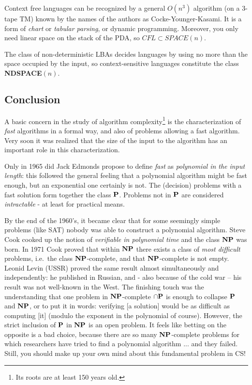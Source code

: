 Context free languages can be recognized by a general $O(n^3)$
algorithm (on a 3-tape TM) known by the names of the authors
as Cocke-Younger-Kasami. It is a form of {\em chart} or {\em tabular
  parsing}, or dynamic programming. Moreover, you only need linear space on the stack of the PDA, so $CFL \subset SPACE(n)$.

The class of non-deterministic LBAs decides languages by using no more
than the space occupied by the input, so context-sensitive languages
constitute the class {\bf NDSPACE}$(n)$.



\subsection{Conclusion}

A basic concern in the study of algorithm complexity\footnote{Its
  roots are at least 150 years old.} is the characterization of {\em
  fast} algorithms in a formal way, and also of problems allowing a
fast algorithm. Very soon it was realized that the size of the input
to the algorithm has an important role in this characterization.

Only in 1965 did Jack Edmonds propose to define {\em fast} as {\em
  polynomial in the input length}: this followed the general feeling
that a polynomial algorithm might be fast enough, but an exponential
one certainly is not. The (decision) problems with a fast solution
form together the class $\P$. Problems not in $\P$ are considered {\em
  intractable} - at least for practical means.

By the end of the 1960's, it became clear that for some seemingly
simple problems (like SAT) nobody was able to construct a polynomial
algorithm. Steve Cook cooked up the notion of {\em verifiable in
  polynomial time} and the class $\NP$ was born. In 1971 Cook proved
that within $\NP$ there exists a class of {\em most difficult}
problems, i.e.\ the class $\NP$-complete, and that $\NP$-complete is
not empty. Leonid Levin (USSR) proved the same result almost
simultaneously and independently: he published in Russian, and - also
because of the cold war -- his result was not well-known in the West.
The finishing touch was the understanding that one problem in
$\NP$-complete $\cap \P$ is enough to collapse $\P$ and $\NP$, or to
put it in words: verifying [a solution] would be as difficult as
computing [it] (modulo the exponent in the polynomial of
course). However, the strict inclusion of $\P$ in $\NP$ is an open
problem. It feels like betting on the opposite is a bad choice,
because there are so many $\NP$-complete problems for which researchers
have tried to find a polynomial algorithm ... and they failed. Still,
you should make up your own mind about this fundamental problem in CS!

